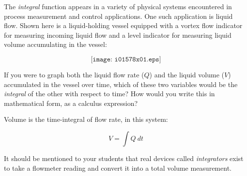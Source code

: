 

The {\it integral} function appears in a variety of physical systems encountered in process measurement and control applications.  One such application is liquid flow.  Shown here is a liquid-holding vessel equipped with a vortex flow indicator for measuring incoming liquid flow and a level indicator for measuring liquid volume accumulating in the vessel:

$$\texttt{[image: i01578x01.eps]}$$

If you were to graph both the liquid flow rate ($Q$) and the liquid volume ($V$) accumulated in the vessel over time, which of these two variables would be the {\it integral} of the other with respect to time?  How would you write this in mathematical form, as a calculus expression?







Volume is the time-integral of flow rate, in this system:

$$V = \int Q \> dt$$







It should be mentioned to your students that real devices called {\it integrators} exist to take a flowmeter reading and convert it into a total volume measurement.




